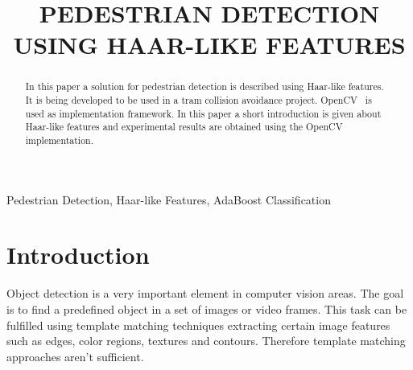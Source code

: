 \documentclass{article}
\title{PEDESTRIAN DETECTION USING HAAR-LIKE FEATURES}
\begin{document}
%
\maketitle
%
\begin{abstract}
In this paper a solution for pedestrian detection is described using Haar-like features. It is being developed to be used in a tram collision avoidance project. OpenCV~\cite{opencv} is used as implementation framework. In this paper a short introduction is given about Haar-like features and experimental results are obtained using the OpenCV implementation.
\end{abstract}
%
\begin{keywords}
Pedestrian Detection, Haar-like Features, AdaBoost Classification
\end{keywords}
%
\section{Introduction}
\label{sec:intro}
Object detection is a very important element in computer vision areas. The goal is to find a predefined object in a set of images or video frames. This task can be fulfilled using template matching techniques extracting certain image features such as edges, color regions, textures and contours. Therefore template matching approaches aren't sufficient.
\par
\end{document}
